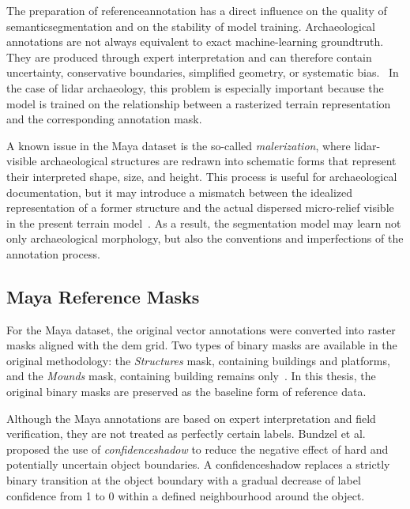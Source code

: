 The preparation of \gls{referenceannotation} has a direct influence on the quality of \gls{semanticsegmentation} and on the stability of model training. Archaeological annotations are not always equivalent to exact machine-learning \gls{groundtruth}. They are produced through expert interpretation and can therefore contain uncertainty, conservative boundaries, simplified geometry, or systematic bias.~\cite{bundzel_semantic_2020,cowley_what_2016,somrak_learning_2020} In the case of \gls{lidar} archaeology, this problem is especially important because the model is trained on the relationship between a rasterized terrain representation and the corresponding annotation mask.

A known issue in the Maya dataset is the so-called \textit{malerization}, where \gls{lidar}-visible archaeological structures are redrawn into schematic forms that represent their interpreted shape, size, and height. This process is useful for archaeological documentation, but it may introduce a mismatch between the idealized representation of a former structure and the actual dispersed micro-relief visible in the present terrain model~\cite{bundzel_semantic_2020}. As a result, the segmentation model may learn not only archaeological morphology, but also the conventions and imperfections of the annotation process.

\subsection{Maya Reference Masks}

For the Maya dataset, the original vector annotations were converted into raster masks aligned with the \gls{dem} grid. Two types of binary masks are available in the original methodology: the \textit{Structures} mask, containing buildings and platforms, and the \textit{Mounds} mask, containing building remains only~\cite{bundzel_semantic_2020}. In this thesis, the original binary masks are preserved as the baseline form of reference data.

Although the Maya annotations are based on expert interpretation and field verification, they are not treated as perfectly certain labels. Bundzel et al.~\cite{bundzel_semantic_2020} proposed the use of \textit{\gls{confidenceshadow}} to reduce the negative effect of hard and potentially uncertain object boundaries. A \gls{confidenceshadow} replaces a strictly binary transition at the object boundary with a gradual decrease of label confidence from 1 to 0 within a defined neighbourhood around the object.

